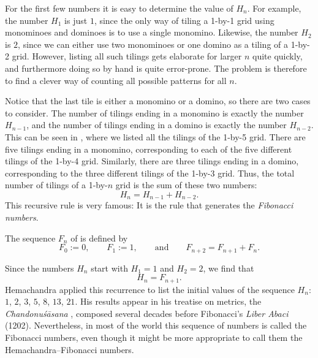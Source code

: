 For the first few numbers it is easy to determine the value of $H_n$. For example, the number $H_1$ is just $1$, since the only way of tiling a 1-by-1 grid using monominoes and dominoes is to use a single monomino. Likewise, the number $H_2$ is $2$, since we can either use two monominoes or one domino as a tiling of a 1-by-2 grid. However, listing all such tilings gets elaborate for larger $n$ quite quickly, and furthermore doing so by hand is quite error-prone. The problem is therefore to find a clever way of counting all possible patterns for all $n$.

Notice that the last tile is either a monomino or a domino, so there are two cases to consider. The number of tilings ending in a monomino is exactly the number $H_{n-1}$, and the number of tilings ending in a domino is exactly the number $H_{n-2}$. This can be seen in , where we listed all the tilings of the 1-by-5 grid. There are five tilings ending in a monomino, corresponding to each of the five different tilings of the 1-by-4 grid. Similarly, there are three tilings ending in a domino, corresponding to the three different tilings of the 1-by-3 grid. Thus, the total number of tilings of a 1-by-$n$ grid is the sum of these two numbers:
\begin{equation*}
  H_n = H_{n-1} + H_{n-2}.
\end{equation*}
This recursive rule is very famous: It is the rule that generates the \emph{Fibonacci numbers}.

\begin{definition}
  The sequence $F_n$ of  is defined by
  \begin{equation*}
    F_0:= 0,\qquad F_1:= 1,\qquad\text{and}\qquad F_{n+2}=F_{n+1}+F_{n}.
  \end{equation*}
\end{definition}

Since the numbers $H_n$ start with $H_1=1$ and $H_2=2$, we find that
\begin{equation*}
  H_n = F_{n+1}.
\end{equation*}
Hemachandra applied this recurrence to list the initial values of the sequence $H_n$:  $1$, $2$, $3$, $5$, $8$, $13$, $21$. His results appear in his treatise on metrics, the \emph{Chandonuśāsana} \cite{hemachandra1961}, composed several decades before Fibonacci's \emph{Liber Abaci} (1202). Nevertheless, in most of the world this sequence of numbers is called the Fibonacci numbers, even though it might be more appropriate to call them the Hemachandra--Fibonacci numbers.

